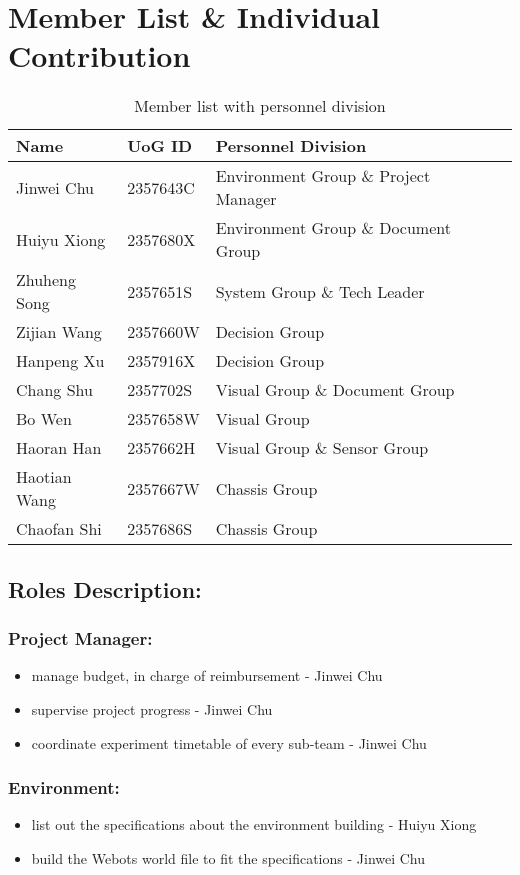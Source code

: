 \appendix
\chapter{Member List \& Individual Contribution\label{appendix}}


\begin{table}[htb]
\centering
\begin{tabular}{lllll}
\toprule
\textbf{Name} & \textbf{UoG ID} & \textbf{Personnel Division}   \\ 
\midrule
Jinwei Chu   & 2357643C  & Environment Group \& Project Manager \\ 
Huiyu Xiong  & 2357680X  & Environment Group \& Document Group\\ 
Zhuheng Song & 2357651S  & System  Group \& Tech Leader\\ 
Zijian Wang  & 2357660W  & Decision Group \\ 
Hanpeng Xu   & 2357916X  & Decision Group \\ 
Chang Shu    & 2357702S  & Visual Group \& Document Group \\ 
Bo Wen       & 2357658W  & Visual Group \\ 
Haoran Han   & 2357662H  & Visual Group \& Sensor Group\\ 
Haotian Wang & 2357667W  & Chassis Group \\ 
Chaofan Shi  & 2357686S  & Chassis Group \\ 
\bottomrule
\end{tabular}
\caption{Member list with personnel division}
\end{table}

\section*{Roles Description:}
\subsection*{Project Manager:}
\begin{itemize}
    \item manage budget, in charge of reimbursement - Jinwei Chu
    \item supervise project progress - Jinwei Chu
    \item coordinate experiment timetable of every sub-team - Jinwei Chu
\end{itemize}

\subsection*{Environment:}
\begin{itemize}
    \item list out the specifications about the environment building - Huiyu Xiong
    \item build the Webots world file to fit the specifications - Jinwei Chu
\end{itemize}

